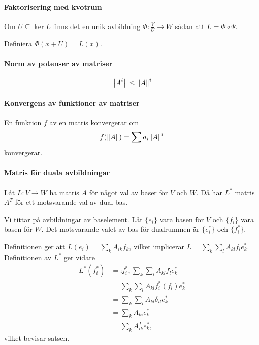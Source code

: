 \proof

\paragraph{Faktorisering med kvotrum}
Om $U\subseteq\ker{L}$ finns det en unik avbildning $\Phi: \frac{V}{U}\to W$ sådan att $L = \Phi\circ\Psi$.

\proof
Definiera $\Phi(x + U) = L(x)$.

\paragraph{Norm av potenser av matriser}
\begin{align*}
	\norm{A^{i}}\leq \norm{A}^{i}
\end{align*}

\proof

\paragraph{Konvergens av funktioner av matriser}
En funktion $f$ av en matris konvergerar om
\begin{align*}
	f(\norm{A}) = \sum a_{i}\norm{A}^{i}
\end{align*}
konvergerar.

\proof

\paragraph{Matris för duala avbildningar}
Låt $L: V\to W$ ha matris $A$ för något val av baser för $V$ och $W$. Då har $L^{*}$ matris $A^{T}$ för ett motsvarande val av dual bas.

\proof
Vi tittar på avbildningar av baselement. Låt $\{e_{i}\}$ vara basen för $V$ och $\{f_{i}\}$ vara basen för $W$. Det motsvarande valet av bas för dualrummen är $\{e_{i}^{*}\}$ och $\{f_{i}^{*}\}$.

Definitionen ger att $L(e_{i}) = \sum\limits_{k}A_{ik}f_{k}$, vilket implicerar $L = \sum\limits_{k}\sum\limits_{l}A_{kl}f_{l}e_{k}^{*}$. Definitionen av $L^{*}$ ger vidare
\begin{align*}
	L^{*}(f_{i}^{*}) &= \comp{{f_{i}^{*}, \sum\limits_{k}\sum\limits_{l}A_{kl}f_{l}e_{k}^{*}}} \\
	                 &= \sum\limits_{k}\sum\limits_{l}A_{kl}f_{i}^{*}(f_{l})e_{k}^{*} \\
	                 &= \sum\limits_{k}\sum\limits_{l}A_{kl}\delta_{il}e_{k}^{*} \\
	                 &= \sum\limits_{k}A_{ki}e_{k}^{*} \\
	                 &= \sum\limits_{k}A_{ik}^{T}e_{k}^{*},
\end{align*}
vilket bevisar satsen.